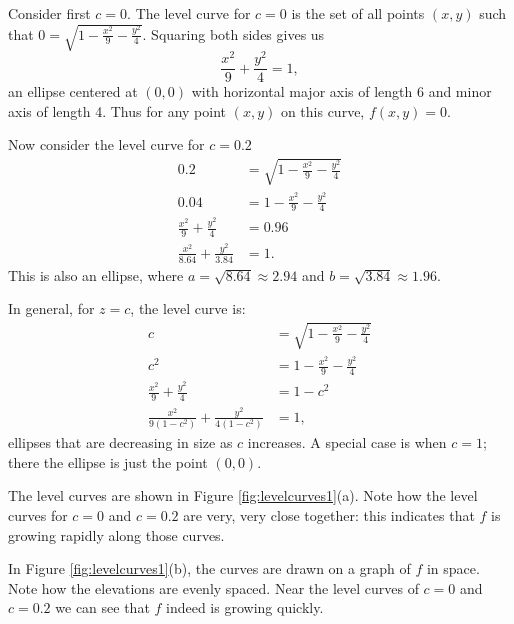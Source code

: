 {Consider first $c=0$. The level curve for $c=0$ is the set of all points $(x,y)$ such that $0=\sqrt{1-\frac{x^2}9-\frac{y^2}4}$. Squaring both sides  gives us
$$\frac{x^2}9+\frac{y^2}4=1,$$ an ellipse centered at $(0,0)$ with horizontal major axis of length 6 and minor axis of length 4. Thus for any point $(x,y)$ on this curve, $f(x,y) = 0$.

Now consider the level curve for $c=0.2$
\begin{align*}
0.2 &= \sqrt{1-\frac{x^2}9-\frac{y^2}4}\\
0.04 &= 1-\frac{x^2}9-\frac{y^2}4\\
\frac{x^2}9+\frac{y^2}4 &=0.96\\
\frac{x^2}{8.64}+\frac{y^2}{3.84} &=1.
\end{align*}
This is also an ellipse, where $a = \sqrt{8.64}\approx 2.94$ and $b=\sqrt{3.84}\approx 1.96$.

In general, for $z=c$, the level curve is:
\begin{align*}
c &= \sqrt{1-\frac{x^2}9-\frac{y^2}4}\\
c^2 &= 1-\frac{x^2}9-\frac{y^2}4\\
\frac{x^2}9+\frac{y^2}4 &=1-c^2\\
\frac{x^2}{9(1-c^2)}+\frac{y^2}{4(1-c^2)} &=1,
\end{align*}
ellipses that are decreasing in size as $c$ increases. A special case is when $c=1$; there the ellipse is just the point $(0,0)$. 

The level curves are shown in Figure \ref{fig:levelcurves1}(a). Note how the level curves for $c=0$ and $c=0.2$ are very, very close together: this indicates that $f$ is growing rapidly along those curves.


In Figure \ref{fig:levelcurves1}(b), the curves are drawn on a graph of $f$ in space. Note how the elevations are evenly spaced. Near the level curves of $c=0$ and $c=0.2$ we can see that $f$ indeed is growing quickly.
}\\

